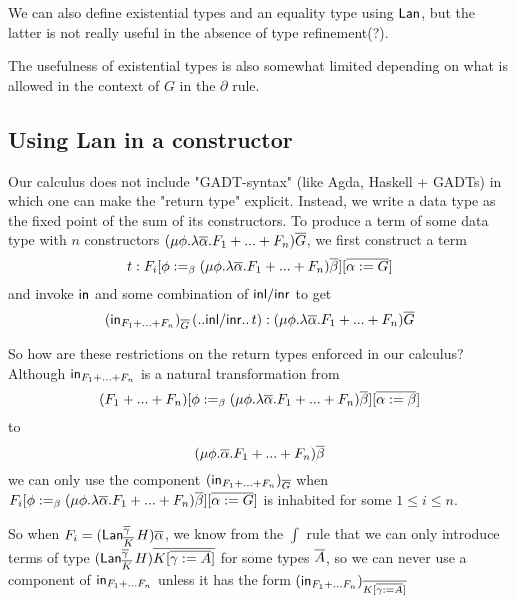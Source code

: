 \documentclass[acmsmall,review,anonymous]{acmart}
\theoremstyle{definition}
\begin{document}
We can also define existential types and an equality type using $\mathsf{Lan}$,
but the latter is not really useful in the absence of type refinement(?).

The usefulness of existential types is also somewhat limited depending on 
what is allowed in the context of $G$ in the $\partial$ rule. 







\subsection{Using Lan in a constructor}
Our calculus does not include "GADT-syntax" (like Agda, Haskell + GADTs) in which 
one can make the "return type" explicit.  Instead,
we write a data type as the fixed point of the sum of its constructors. 
To produce a term of some data type with $n$ constructors $(\mu \phi. \lambda \overline{\alpha}. F_1 + ... + F_n)\overline{G}$,
we first construct a term 
$$t : F_i [\phi :=_\beta (\mu \phi. \lambda \overline{\alpha}. F_1 + ... + F_n)\overline{\beta}][\overline{\alpha := G}]$$
and invoke $\mathsf{in}$ and some combination of $\mathsf{inl}/\mathsf{inr}$ to get 
$$(\mathsf{in}_{F_1 + ... + F_n})_{\overline{G}} \, (..\mathsf{inl}/\mathsf{inr}..  \,t) : (\mu \phi. \lambda \overline{\alpha}. F_1 + ... + F_n)\overline{G}$$

So how are
these restrictions on the return types enforced in our calculus?
Although $\mathsf{in}_{F_1 + ... + F_n}$ is a natural transformation from 
$$(F_1 + ... + F_n)[\phi :=_\beta (\mu \phi. \lambda \overline{\alpha}. F_1 + ... + F_n)\overline{\beta}][\overline{\alpha := \beta}]$$
to 
$$(\mu \phi.\overline{\alpha}. F_1 + ... + F_n)\overline{\beta}$$
we can only use the component $(\mathsf{in}_{F_1 + ... + F_n})_{\overline{G}}$ when
$F_i [\phi :=_\beta (\mu \phi. \lambda \overline{\alpha}. F_1 + ... + F_n)\overline{\beta}][\overline{\alpha := G}]$
is inhabited for some $1 \le i \le n$. 

So when $F_i = (\mathsf{Lan}^{\overline{\gamma}}_{\overline{K}} \,H)\overline{\alpha}$, we know from the $\int$ rule
that we can only introduce terms of type $(\mathsf{Lan}^{\overline{\gamma}}_{\overline{K}} \,H)\overline{K[\overline{\gamma := A}]}$
for some types $\overline{A}$, so we can never use a component of $\mathsf{in}_{F_1 + ... F_n}$ unless it has the form
$(\mathsf{in}_{F_1 + ... F_n})_{\overline{K[\overline{\gamma := A}]}}$
\end{document}
